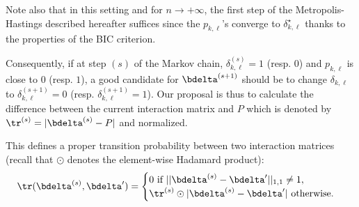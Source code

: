 Note also that in this setting and for $n \to +\infty$, the first step of the Metropolis-Hastings described hereafter suffices since the $p_{k,\ell}$'s converge to $\delta_{k,\ell}^\star$ thanks to the properties of the BIC criterion.

Consequently, if at step $(s)$ of the Markov chain, $\delta_{k,\ell}^{(s)} = 1$ (resp. $0$) and $p_{k,\ell}$ is close to $0$ (resp. $1$), a good candidate for $\bdelta^{(s+1)}$ should be to change $\delta_{k,\ell}$ to $\delta_{k,\ell}^{(s+1)} = 0$ (resp. $\delta_{k,\ell}^{(s+1)} = 1$). Our proposal is thus to calculate the difference between the current interaction matrix and $P$ which is denoted by $\tr^{(s)} = |\bdelta^{(s)} - P|$ and normalized.

This defines a proper transition probability between two interaction matrices (recall that $\odot$ denotes the element-wise Hadamard product):
\[ \tr(\bdelta^{(s)},\bdelta') = \begin{cases} 0 \text{ if } ||\bdelta^{(s)} - \bdelta'||_{1,1} \neq 1, \\ \tr^{(s)} \odot |\bdelta^{(s)} - \bdelta'| \text{ otherwise}. \end{cases} \]

